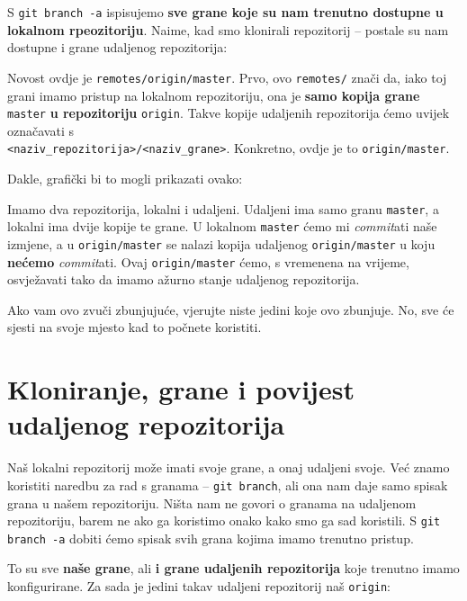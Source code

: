S \verb+git branch -a+ ispisujemo \textbf{sve grane koje su nam trenutno dostupne u lokalnom rpeozitoriju}.
Naime, kad smo klonirali repozitorij -- postale su nam dostupne i grane udaljenog repozitorija:



Novost ovdje je \verb+remotes/origin/master+.
Prvo, ovo \verb+remotes/+ znači da, iako toj grani imamo pristup na lokalnom repozitoriju, ona je \textbf{samo kopija grane} \verb+master+ \textbf{u repozitoriju} \verb+origin+.
Takve kopije udaljenih repozitorija ćemo uvijek označavati s \\ \verb+<naziv_repozitorija>/<naziv_grane>+.
Konkretno, ovdje je to \verb+origin/master+.

Dakle, grafički bi to mogli prikazati ovako:



Imamo dva repozitorija, lokalni i udaljeni.
Udaljeni ima samo granu \verb+master+, a lokalni ima dvije kopije te grane. 
U lokalnom \verb+master+ ćemo mi \emph{commit}ati naše izmjene, a u \verb+origin/master+ se nalazi kopija udaljenog \verb+origin/master+ u koju \textbf{nećemo} \emph{commit}ati.
Ovaj \verb+origin/master+ ćemo, s vremenena na vrijeme, osvježavati tako da imamo ažurno stanje udaljenog repozitorija.

Ako vam ovo zvuči zbunjujuće, vjerujte niste jedini koje ovo zbunjuje.
No, sve će sjesti na svoje mjesto kad to počnete koristiti.

\section*{Kloniranje, grane i povijest udaljenog repozitorija}

Naš lokalni repozitorij može imati svoje grane, a onaj udaljeni svoje.
Već znamo koristiti naredbu za rad s granama -- \verb+git branch+, ali ona nam daje samo spisak grana u našem repozitoriju.
Ništa nam ne govori o granama na udaljenom repozitoriju, barem ne ako ga koristimo onako kako smo ga sad koristili.
S \verb+git branch -a+ dobiti ćemo spisak svih grana kojima imamo trenutno pristup.

To su sve \textbf{naše grane}, ali \textbf{i grane udaljenih repozitorija} koje trenutno imamo konfigurirane.
Za sada je jedini takav udaljeni repozitorij naš \verb+origin+:



